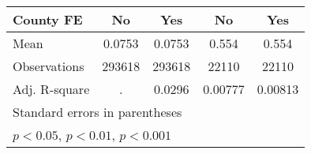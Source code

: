 \begin{table}[htbp]
{\begin{tabular}{l*{4}{c}}
            County FE                                          & No                                   & Yes                                  & No                      & Yes                     \\
            \midrule
            Mean                                               & 0.0753                               & 0.0753                               & 0.554                   & 0.554                   \\
            Observations                                       & 293618                               & 293618                               & 22110                   & 22110                   \\
            Adj. R-square                                      & .                                    & 0.0296                               & 0.00777                 & 0.00813                 \\
            \bottomrule
            \multicolumn{5}{l}{\footnotesize Standard errors in parentheses}                                                                                                                     \\
            \multicolumn{5}{l}{\footnotesize \sym{*} \(p<0.05\), \sym{**} \(p<0.01\), \sym{***} \(p<0.001\)}                                                                                     \\
        \end{tabular}
    }
\end{table}
